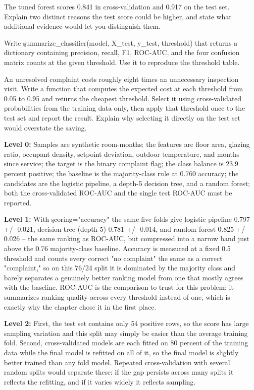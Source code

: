 
The tuned forest scores 0.841 in cross-validation and 0.917 on the test set.
Explain two distinct reasons the test score could be higher, and state what
additional evidence would let you distinguish them.


Write \c{summarize_classifier(model, X_test, y_test, threshold)} that returns a
dictionary containing precision, recall, F1, ROC-AUC, and the four confusion
matrix counts at the given threshold. Use it to reproduce the threshold table.


An unresolved complaint costs roughly eight times an unnecessary inspection
visit. Write a function that computes the expected cost at each threshold from
0.05 to 0.95 and returns the cheapest threshold. Select it using cross-validated
probabilities from the training data only, then apply that threshold once to the
test set and report the result. Explain why selecting it directly on the test
set would overstate the saving.


\textbf{Level 0:} Samples are synthetic room-months; the features are floor
area, glazing ratio, occupant density, setpoint deviation, outdoor temperature,
and months since service; the target is the binary complaint flag; the class
balance is 23.9 percent positive; the baseline is the majority-class rule at
0.760 accuracy; the candidates are the logistic pipeline, a depth-5 decision
tree, and a random forest; both the cross-validated ROC-AUC and the single test
ROC-AUC must be reported.

\textbf{Level 1:} With \c{scoring="accuracy"} the same five folds give logistic
pipeline 0.797 +/- 0.021, decision tree (depth 5) 0.781 +/- 0.014, and random
forest 0.825 +/- 0.026 -- the same ranking as ROC-AUC, but compressed into a
narrow band just above the 0.76 majority-class baseline. Accuracy is measured
at a fixed 0.5 threshold and counts every correct "no complaint" the same as a
correct "complaint," so on this 76/24 split it is dominated by the majority
class and barely separates a genuinely better ranking model from one that
mostly agrees with the baseline. ROC-AUC is the comparison to trust for this
problem: it summarizes ranking quality across every threshold instead of one,
which is exactly why the chapter chose it in the first place.

\textbf{Level 2:} First, the test set contains only 54 positive rows, so the
score has large sampling variation and this split may simply be easier than the
average training fold. Second, cross-validated models are each fitted on 80
percent of the training data while the final model is refitted on all of it, so
the final model is slightly better trained than any fold model. Repeated
cross-validation with several random splits would separate these: if the gap
persists across many splits it reflects the refitting, and if it varies widely it
reflects sampling.


